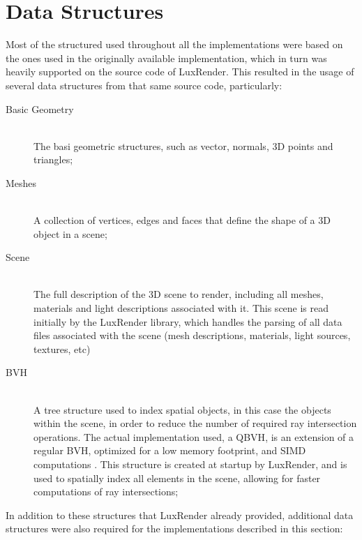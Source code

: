 \documentclass[main.tex]{subfiles}
\begin{document}
\section{Data Structures} \label{section:data_structures}

Most of the structured used throughout all the implementations were based on the ones used in the originally available implementation, which in turn was heavily supported on the source code of LuxRender. This resulted in the usage of several data structures from that same source code, particularly:

\begin{description}
\item[Basic Geometry] \hfill \\
  The basi geometric structures, such as vector, normals, 3D points and triangles;

\item[Meshes] \hfill \\
  A collection of vertices, edges and faces that define the shape of a 3D object in a scene;

\item[Scene] \hfill \\
  The full description of the 3D scene to render, including all meshes, materials and light descriptions associated with it. This scene is read initially by the LuxRender library, which handles the parsing of all data files associated with the scene (mesh descriptions, materials, light sources, textures, etc)

\item[\acl{BVH}] \hfill \\
  A tree structure used to index spatial objects, in this case the objects within the scene, in order to reduce the number of required ray intersection operations. The actual implementation used, a \acf{QBVH}, is an extension of a regular \acs{BVH}, optimized for a low memory footprint, and \acs{SIMD} computations \cite{dammertz2008shallow,Stich2009hpg}. This structure is created at startup by LuxRender, and is used to spatially index all elements in the scene, allowing for faster computations of ray intersections;

\end{description}

In addition to these structures that LuxRender already provided, additional data structures were also required for the implementations described in this section:
\end{document}
